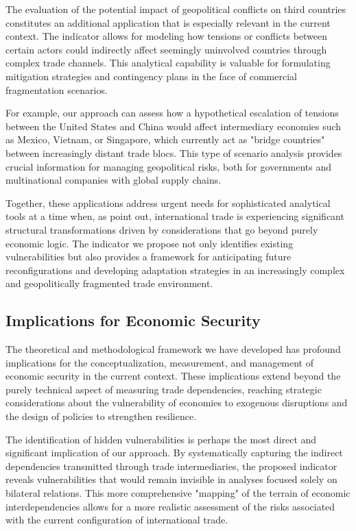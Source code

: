 \documentclass[final,1p,times,authoryear]{elsarticle}
\begin{document}
The evaluation of the potential impact of geopolitical conflicts on third countries constitutes an additional application that is especially relevant in the current context. The indicator allows for modeling how tensions or conflicts between certain actors could indirectly affect seemingly uninvolved countries through complex trade channels. This analytical capability is valuable for formulating mitigation strategies and contingency plans in the face of commercial fragmentation scenarios.

For example, our approach can assess how a hypothetical escalation of tensions between the United States and China would affect intermediary economies such as Mexico, Vietnam, or Singapore, which currently act as "bridge countries" between increasingly distant trade blocs. This type of scenario analysis provides crucial information for managing geopolitical risks, both for governments and multinational companies with global supply chains.

Together, these applications address urgent needs for sophisticated analytical tools at a time when, as \citet{Gopinath2024} point out, international trade is experiencing significant structural transformations driven by considerations that go beyond purely economic logic. The indicator we propose not only identifies existing vulnerabilities but also provides a framework for anticipating future reconfigurations and developing adaptation strategies in an increasingly complex and geopolitically fragmented trade environment.

\subsection{Implications for Economic Security}

The theoretical and methodological framework we have developed has profound implications for the conceptualization, measurement, and management of economic security in the current context. These implications extend beyond the purely technical aspect of measuring trade dependencies, reaching strategic considerations about the vulnerability of economies to exogenous disruptions and the design of policies to strengthen resilience.

The identification of hidden vulnerabilities is perhaps the most direct and significant implication of our approach. By systematically capturing the indirect dependencies transmitted through trade intermediaries, the proposed indicator reveals vulnerabilities that would remain invisible in analyses focused solely on bilateral relations. This more comprehensive "mapping" of the terrain of economic interdependencies allows for a more realistic assessment of the risks associated with the current configuration of international trade.
\end{document}
